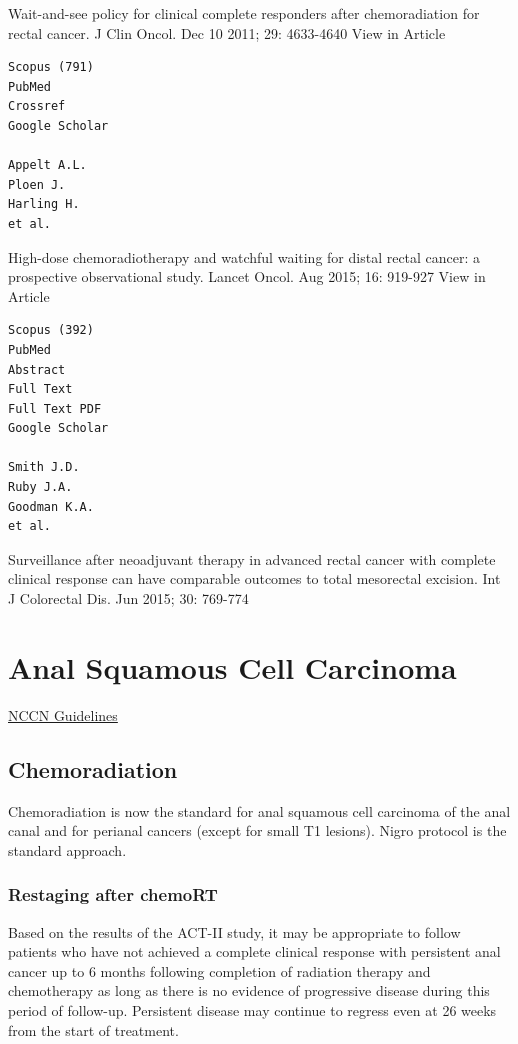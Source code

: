 \documentclass[
]{book}
\begin{document}
Wait-and-see policy for clinical complete responders after chemoradiation for rectal cancer.
J Clin Oncol. Dec 10 2011; 29: 4633-4640
View in Article

\begin{verbatim}
Scopus (791)
PubMed
Crossref
Google Scholar

Appelt A.L.
Ploen J.
Harling H.
et al.
\end{verbatim}

High-dose chemoradiotherapy and watchful waiting for distal rectal cancer: a prospective observational study.
Lancet Oncol. Aug 2015; 16: 919-927
View in Article

\begin{verbatim}
Scopus (392)
PubMed
Abstract
Full Text
Full Text PDF
Google Scholar

Smith J.D.
Ruby J.A.
Goodman K.A.
et al.
\end{verbatim}

Surveillance after neoadjuvant therapy in advanced rectal cancer with complete clinical response can have comparable outcomes to total mesorectal excision.
Int J Colorectal Dis. Jun 2015; 30: 769-774

\hypertarget{anal-squamous-cell-carcinoma}{%
\chapter{Anal Squamous Cell Carcinoma}\label{anal-squamous-cell-carcinoma}}

\href{https://www.nccn.org/professionals/physician_gls/pdf/anal_blocks.pdf}{NCCN Guidelines}

\hypertarget{chemoradiation}{%
\section{Chemoradiation}\label{chemoradiation}}

Chemoradiation is now the standard for anal squamous cell carcinoma of the anal canal and for perianal cancers (except for small T1 lesions). Nigro protocol is the standard approach.\citep{nigro1826}

\hypertarget{restaging-after-chemort}{%
\subsection{Restaging after chemoRT}\label{restaging-after-chemort}}

Based on the results of the ACT-II study, it may be appropriate to follow patients who have not achieved a complete clinical response with persistent anal cancer up to 6 months following completion of radiation therapy and chemotherapy as long as there is no evidence of progressive disease during this period of follow-up. Persistent disease may continue to regress even at 26 weeks from the start of treatment.\citep{james516}
\end{document}
